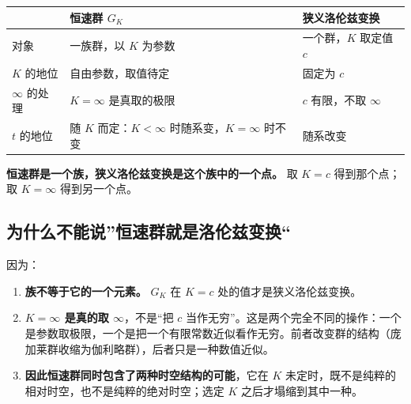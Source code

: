 \documentclass[
  chinese,
  a4paper,
  UTF8,
  12pt,
  oneside,
  openany]{ctexbook}
\newcounter{none} %
\providecommand{\tightlist}{%
  \setlength{\itemsep}{0pt}\setlength{\parskip}{0pt}}
\theoremstyle{plain}
\theoremstyle{plain}
\theoremstyle{plain}
\theoremstyle{definition}
\theoremstyle{plain}
\theoremstyle{plain}
\theoremstyle{remark}
\begin{document}
{\def\LTcaptype{none} %
\begin{longtable}[]{@{}
  >{\raggedright\arraybackslash}p{}
  >{\raggedright\arraybackslash}p{}
  >{\raggedright\arraybackslash}p{}@{}}
\toprule\noalign{}
\begin{minipage}[b]{\linewidth}\raggedright
\end{minipage} & \begin{minipage}[b]{\linewidth}\raggedright
恒速群 \(G_K\)
\end{minipage} & \begin{minipage}[b]{\linewidth}\raggedright
狭义洛伦兹变换
\end{minipage} \\
\midrule\noalign{}
\endhead
\bottomrule\noalign{}
\endlastfoot
对象 & 一族群，以 \(K\) 为参数 & 一个群，\(K\) 取定值 \(c\) \\
\(K\) 的地位 & 自由参数，取值待定 & 固定为 \(c\) \\
\(\infty\) 的处理 & \(K=\infty\) 是真取的极限 & \(c\) 有限，不取
\(\infty\) \\
\(t\) 的地位 & 随 \(K\) 而定：\(K<\infty\) 时随系变，\(K=\infty\) 时不变
& 随系改变 \\
\end{longtable}
}

\textbf{恒速群是一个族，狭义洛伦兹变换是这个族中的一个点。} 取 \(K=c\)
得到那个点；取 \(K=\infty\) 得到另一个点。

\subsection{为什么不能说''恒速群就是洛伦兹变换``}\label{ux4e3aux4ec0ux4e48ux4e0dux80fdux8bf4ux6052ux901fux7fa4ux5c31ux662fux6d1bux4f26ux5179ux53d8ux6362}

因为：

\begin{enumerate}
\def\labelenumi{\arabic{enumi}.}
\tightlist
\item
  \textbf{族不等于它的一个元素。} \(G_K\) 在 \(K=c\)
  处的值才是狭义洛伦兹变换。
\item
  \textbf{\(K=\infty\) 是真的取 \(\infty\)}，不是``把 \(c\)
  当作无穷''。这是两个完全不同的操作：一个是参数取极限，一个是把一个有限常数近似看作无穷。前者改变群的结构（庞加莱群收缩为伽利略群），后者只是一种数值近似。
\item
  \textbf{因此恒速群同时包含了两种时空结构的可能}，它在 \(K\)
  未定时，既不是纯粹的相对时空，也不是纯粹的绝对时空；选定 \(K\)
  之后才塌缩到其中一种。
\end{enumerate}
\end{document}
